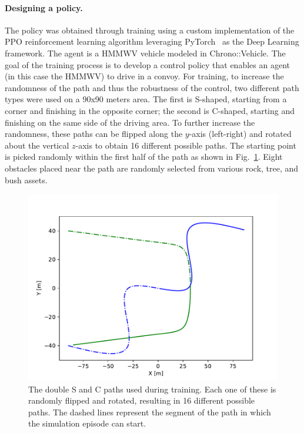 \documentclass[12pt,twocolumn]{article}
\begin{document}
\paragraph{Designing a policy.} The policy was obtained through training using a custom implementation of the PPO reinforcement learning algorithm leveraging PyTorch~\cite{paszke2017PyTorch} as the Deep Learning framework. The agent is a HMMWV vehicle modeled in Chrono::Vehicle. The goal of the training process is to develop a control policy that enables an agent (in this case the HMMWV) to drive in a convoy. For training, to increase the randomness of the path and thus the robustness of the control, two different path types were used on a 90x90 meters area. The first is S-shaped, starting from a corner and finishing in the opposite corner; the second is C-shaped, starting and finishing on the same side of the driving area. To further increase the randomness, these paths can be flipped along the $y$-axis (left-right) and rotated about the vertical $z$-axis to obtain 16 different possible paths. The starting point is picked randomly within the first half of the path as shown in Fig.~\ref{fig:paths}. Eight obstacles placed near the path are randomly selected from various rock, tree, and bush assets. 


\begin{figure}
    \centering
    \includegraphics[width=\columnwidth]{Figs/base_paths.pdf} 
    \caption{The double S and C paths used during training. Each one of these is randomly flipped and rotated, resulting in 16 different possible paths. The dashed lines represent the segment of the path in which the simulation episode can start.}
    \label{fig:paths}
\end{figure}
\end{document}
